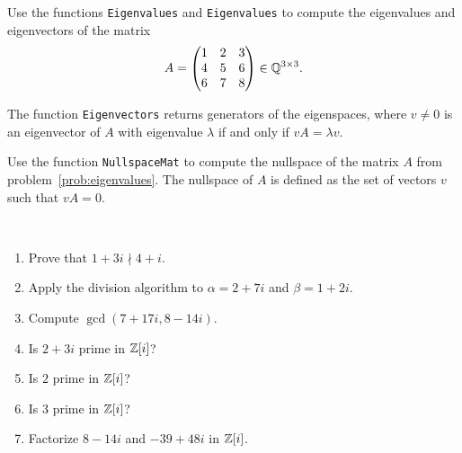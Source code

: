 \begin{prob}
  \label{prob:eigenvalues}
  Use the functions \lstinline{Eigenvalues} and \lstinline{Eigenvalues} to
  compute the eigenvalues and eigenvectors of the matrix
  \[
    A=\begin{pmatrix}	
      1 & 2 & 3\\
      4 & 5 & 6\\
      6 & 7 & 8
    \end{pmatrix}\in\mathbb{Q}^{3\times3}.
  \]

  The function \lstinline{Eigenvectors} returns generators of the eigenspaces,
  where $v\ne0$ is an eigenvector of $A$ with eigenvalue $\lambda$ if and only
  if $vA=\lambda v$. 
\end{prob}

\begin{prob}
  Use the function \lstinline{NullspaceMat} to compute the nullspace 
  of the matrix $A$ from problem~\ref{prob:eigenvalues}. 
  The nullspace of $A$ is defined as the set of vectors $v$ such
  that $vA=0$. 
\end{prob}

\begin{prob}\
    \begin{enumerate}
        \item Prove that $1+3i\nmid 4+i$.
        \item Apply the division algorithm to $\alpha=2+7i$ and $\beta=1+2i$.
        \item Compute $\gcd(7+17i,8-14i)$.
        \item Is $2+3i$ prime in $\mathbb{Z}[i]$?
        \item Is $2$ prime in $\mathbb{Z}[i]$?
        \item Is $3$ prime in $\mathbb{Z}[i]$?
        \item Factorize $8-14i$ and $-39+48i$ in $\mathbb{Z}[i]$.
    \end{enumerate}
\end{prob}

